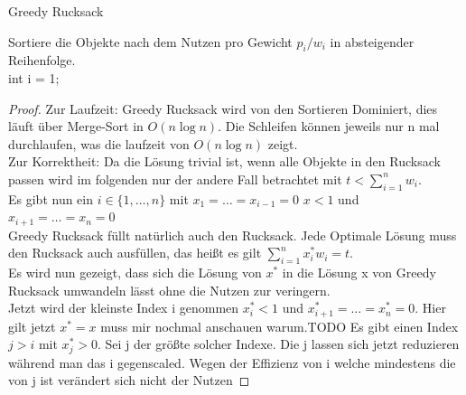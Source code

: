 \documentclass{report}
\begin{document}
\begin{algorithm}[H]
\caption{Greedy Rucksack}
Sortiere die Objekte nach dem Nutzen pro Gewicht $p_{i}/w_{i}$ in absteigender Reihenfolge.\\
int i = 1;\\
\end{algorithm}
\begin{proof}
	Zur Laufzeit: Greedy Rucksack wird von den Sortieren Dominiert, dies läuft über Merge-Sort in $O(n \log n)$. Die Schleifen können jeweils nur n mal durchlaufen, was die laufzeit von $O(n \log n)$ zeigt.\\
	Zur Korrektheit: Da die Lösung trivial ist, wenn alle Objekte in den Rucksack passen wird im folgenden nur der andere Fall betrachtet mit $t < \sum_{i=1}^{n} w_{i}$.\\
	Es gibt nun ein $i \in \{1, \dots, n\}$ mit $x_{1} = \dots = x_{i-1} = 0 $ $x < 1 $ und $x_{i+1} = \dots = x_{n} = 0$\\
	Greedy Rucksack füllt natürlich auch den Rucksack. Jede Optimale Lösung muss den Rucksack auch ausfüllen, das heißt es gilt $\sum_{i=1}^{n} x_{i}^{*} w_{i} = t$.\\
	Es wird nun gezeigt, dass sich die Lösung von $x^{*}$ in die Lösung x von Greedy Rucksack umwandeln lässt ohne die Nutzen zur veringern.\\
	Jetzt wird der kleinste Index i genommen $x_{i}^{*} < 1$ und $x_{i+1}^{*} = \dots = x_{n}^{*} = 0$. Hier gilt jetzt $x^{*} = x$ muss mir nochmal anschauen warum.TODO
	Es gibt einen Index $j > i$ mit $x_{j}^{*} > 0$. Sei j der größte solcher Indexe. Die j lassen sich jetzt reduzieren während man das i gegenscaled. Wegen der Effizienz von i welche mindestens die von j ist verändert sich nicht der Nutzen
\end{proof}
\end{document}
